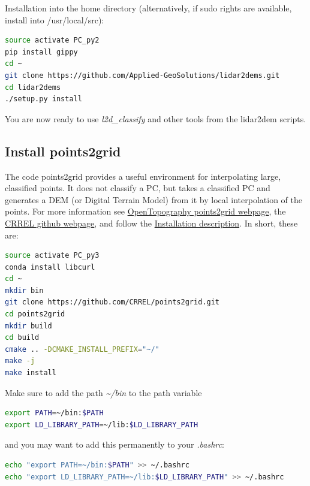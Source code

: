 \documentclass[a4paperpaper,,tablecaptionabove]{scrartcl}
\begin{document}
Installation into the home directory (alternatively, if sudo rights are
available, install into /usr/local/src):

\begin{lstlisting}[language=bash]
source activate PC_py2
pip install gippy 
cd ~
git clone https://github.com/Applied-GeoSolutions/lidar2dems.git
cd lidar2dems
./setup.py install
\end{lstlisting}

You are now ready to use \emph{l2d\_classify} and other tools from the
lidar2dem scripts.

\hypertarget{install-points2grid}{%
\subsection{Install points2grid}\label{install-points2grid}}

The code points2grid provides a useful environment for interpolating
large, classified points. It does not classify a PC, but takes a
classified PC and generates a DEM (or Digital Terrain Model) from it by
local interpolation of the points. For more information see
\href{http://opentopo.sdsc.edu/tools/viewTool?toolId=201}{OpenTopography
points2grid webpage}, the
\href{https://github.com/CRREL/points2grid/}{CRREL github webpage}, and
follow the
\href{https://github.com/CRREL/points2grid/blob/master/INSTALL.md}{Installation
description}. In short, these are:

\begin{lstlisting}[language=bash]
source activate PC_py3
conda install libcurl
cd ~
mkdir bin
git clone https://github.com/CRREL/points2grid.git
cd points2grid
mkdir build 
cd build
cmake .. -DCMAKE_INSTALL_PREFIX="~/"
make -j
make install
\end{lstlisting}

Make sure to add the path \emph{\textasciitilde{}/bin} to the path
variable

\begin{lstlisting}[language=bash]
export PATH=~/bin:$PATH
export LD_LIBRARY_PATH=~/lib:$LD_LIBRARY_PATH
\end{lstlisting}

and you may want to add this permanently to your \emph{.bashrc}:

\begin{lstlisting}[language=bash]
echo "export PATH=~/bin:$PATH" >> ~/.bashrc
echo "export LD_LIBRARY_PATH=~/lib:$LD_LIBRARY_PATH" >> ~/.bashrc
\end{lstlisting}
\end{document}
